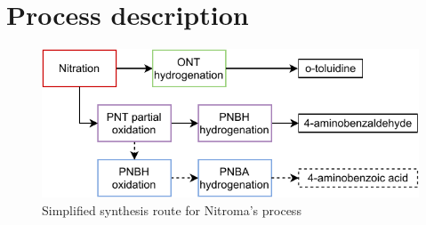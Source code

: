 \section{Process description}

\begin{figure}
    \centering
    \includegraphics{chapters/0-executive-summary/figures/BFD_nitroma-Page-3.pdf}
    \caption{Simplified synthesis route for Nitroma's process}
    \label{fig:BFD-ES}
\end{figure}





